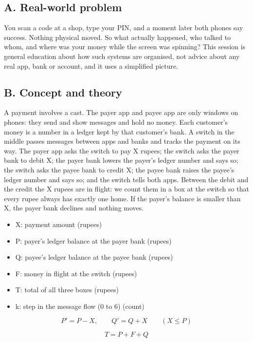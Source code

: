 \documentclass[11pt,a4paper]{article}
\begin{document}
\subsection*{A. Real-world problem}
You scan a code at a shop, type your PIN, and a moment later both phones say success. Nothing physical moved. So what actually happened, who talked to whom, and where was your money while the screen was spinning? This session is general education about how such systems are organised, not advice about any real app, bank or account, and it uses a simplified picture.

\subsection*{B. Concept and theory}
A payment involves a cast. The payer app and payee app are only windows on phones: they send and show messages and hold no money. Each customer's money is a number in a ledger kept by that customer's bank. A switch in the middle passes messages between apps and banks and tracks the payment on its way. The payer app asks the switch to pay X rupees; the switch asks the payer bank to debit X; the payer bank lowers the payer's ledger number and says so; the switch asks the payee bank to credit X; the payee bank raises the payee's ledger number and says so; and the switch tells both apps. Between the debit and the credit the X rupees are in flight: we count them in a box at the switch so that every rupee always has exactly one home. If the payer's balance is smaller than X, the payer bank declines and nothing moves.

\begin{itemize}[nosep]
\item X: payment amount (rupees)
\item P: payer's ledger balance at the payer bank (rupees)
\item Q: payee's ledger balance at the payee bank (rupees)
\item F: money in flight at the switch (rupees)
\item T: total of all three boxes (rupees)
\item k: step in the message flow (0 to 6) (count)
\end{itemize}

\begin{equation*}
P' = P - X,\qquad Q' = Q + X\qquad (X \le P)
\end{equation*}

\begin{equation*}
T = P + F + Q
\end{equation*}
\end{document}
